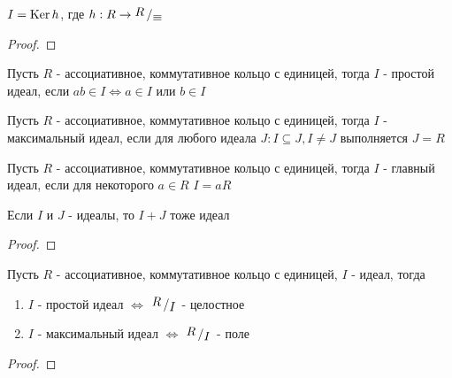 \documentclass[../main/document.tex]{subfiles}
\begin{document}
\begin{cnsq}
$I=\operatorname{Ker} h$, где $h:R\to\bigslant{R}{\equiv} $
\begin{proof}

\end{proof}
\end{cnsq}
\begin{dfn}\label{prime-ideal}
Пусть $R$ - ассоциативное, коммутативное кольцо с единицей, тогда $I$ - простой идеал, если $ab\in I\Leftrightarrow a\in I$ или $b\in I$
\end{dfn}
\begin{dfn}\label{maximal-ideal}
Пусть $R$ - ассоциативное, коммутативное кольцо с единицей, тогда $I$ - максимальный идеал, если для любого идеала $J: I\subseteq J, I\neq J$ выполняется $J=R$
\end{dfn}
\begin{dfn}
Пусть $R$ - ассоциативное, коммутативное кольцо с единицей, тогда $I$ - главный идеал, если для некоторого $a\in R$ $I=aR$
\end{dfn}
\begin{exm}[??????]

\end{exm}
\begin{lemma}
Если $I$ и $J$ - идеалы, то $I+J$ тоже идеал
\begin{proof}

\end{proof}
\end{lemma}
\begin{thm}
Пусть $R$ - ассоциативное, коммутативное кольцо с единицей, $I$ - идеал, тогда
\begin{enumerate}
\item $I$ - простой идеал $\Leftrightarrow$ $\bigslant{R}{I}$ - целостное
\item $I$ - максимальный идеал $\Leftrightarrow$ $\bigslant{R}{I}$ - поле
\end{enumerate}
\begin{proof}

\end{proof}
\end{thm}
\end{document}
